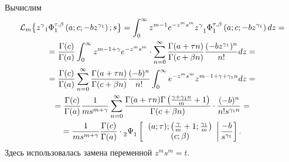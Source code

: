 Вычислим
\begin{multline*}
\mathcal L_m\bigl\{z^{\gamma} {_1}\Phi_1^{\tau,\beta}\left(a;c;-bz^{\gamma_1}\right);s\bigr\}=
\int_0^{\infty}z^{m-1}e^{-z^ms^m}z^{\gamma}{\mathstrut}_1\Phi {\mathstrut}_1^{\tau,\beta}\left(a;c;-bz^{\gamma_1}\right)dz=
\\
=
\frac{\Gamma(c)}{\Gamma(a)}\int _0^{\infty}z^{m-1+\gamma}e^{-z^ms^m}\cdot \sum\limits_{n=0}^{\infty}
  \frac{\Gamma(a+\tau n)}{\Gamma(c+\beta n)}\frac{(-bz^{\gamma_1})^n}{n!}dz=
  \\
=
\frac{\Gamma(c)}{\Gamma(a)}\sum_{n=0}^{\infty}
  \frac{\Gamma(a+\tau n)}{\Gamma(c+\beta n)}\frac{(-b)^n}{n!} \int_0^{\infty}e^{-z^ms^m}z^{m-1+\gamma+\gamma_1 n}dz= 
  \\
=\frac{\Gamma(c)}{\Gamma(a)}\frac{1}{ms^{m+\gamma}}\sum\limits_{n=0}^{\infty}
  \frac{\Gamma(a+\tau n)\Gamma\left(\frac{\gamma+\gamma_1 n}{m}+1\right)}{\Gamma(c+\beta n)}\cdot\frac{(-b)^n}{n!s^{\gamma_1 n}}=
\\
=\frac{1}{ms^{m+\gamma}}\frac{\Gamma(c)}{\Gamma(a)}\cdot 
  {\mathstrut}_2\Psi {\mathstrut}_1\left[\left.
  \begin{array}{c}
    (a;\tau); \left(\frac{\gamma}{m}+1;\frac{\gamma_1}{m}\right)\\
    (c;\beta)
  \end{array}\right| \frac{-b}{s^{\gamma_1}}\right].
\end{multline*}
Здесь использовалась замена переменной $ z^ms^m=t$.

